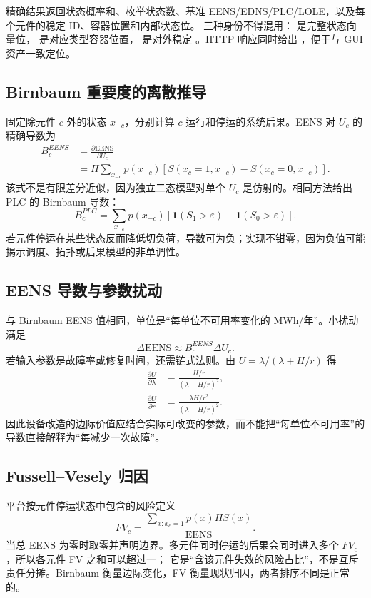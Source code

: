 精确结果返回状态概率和、枚举状态数、基准 EENS/EDNS/PLC/LOLE，以及每个元件的稳定 ID、容器位置和内部状态位。
三种身份不得混用： 是完整状态向量位， 是对应类型容器位置，
 是对外稳定 。HTTP 响应同时给出 ，便于与 GUI 资产一致定位。

\subsection{Birnbaum 重要度的离散推导}
固定除元件 $c$ 外的状态 $x_{-c}$，分别计算 $c$ 运行和停运的系统后果。EENS 对 $U_c$ 的精确导数为
\begin{align}
 B_c^{EENS}
 &=\frac{\partial\mathrm{EENS}}{\partial U_c}\\
 &=H\sum_{x_{-c}}p(x_{-c})
 \left[S(x_c{=}1,x_{-c})-S(x_c{=}0,x_{-c})\right].
 \label{eq:rel-birnbaum-eens}
\end{align}
该式不是有限差分近似，因为独立二态模型对单个 $U_c$ 是仿射的。相同方法给出 PLC 的 Birnbaum 导数：
\begin{equation}
 B_c^{PLC}=\sum_{x_{-c}}p(x_{-c})
 \left[\mathbf 1(S_1>\varepsilon)-\mathbf 1(S_0>\varepsilon)\right].
\end{equation}
若元件停运在某些状态反而降低切负荷，导数可为负；实现不钳零，因为负值可能揭示调度、拓扑或后果模型的非单调性。

\subsection{EENS 导数与参数扰动}
 与
Birnbaum EENS 值相同，单位是“每单位不可用率变化的 MWh/年”。小扰动满足
\begin{equation}
 \Delta\mathrm{EENS}\approx B_c^{EENS}\Delta U_c.
\end{equation}
若输入参数是故障率或修复时间，还需链式法则。由 $U=\lambda/(\lambda+H/r)$ 得
\begin{align}
 \frac{\partial U}{\partial\lambda}
 &=\frac{H/r}{(\lambda+H/r)^2},\\
 \frac{\partial U}{\partial r}
 &=\frac{\lambda H/r^2}{(\lambda+H/r)^2}.
\end{align}
因此设备改造的边际价值应结合实际可改变的参数，而不能把“每单位不可用率”的导数直接解释为“每减少一次故障”。

\subsection{Fussell--Vesely 归因}
平台按元件停运状态中包含的风险定义
\begin{equation}
 FV_c=\frac{\sum_{x:x_c=1}p(x)H S(x)}{\mathrm{EENS}}.
 \label{eq:rel-fv}
\end{equation}
当总 EENS 为零时取零并声明边界。多元件同时停运的后果会同时进入多个 $FV_c$，所以各元件 FV 之和可以超过一；
它是“含该元件失效的风险占比”，不是互斥责任分摊。Birnbaum 衡量边际变化，FV 衡量现状归因，两者排序不同是正常的。

